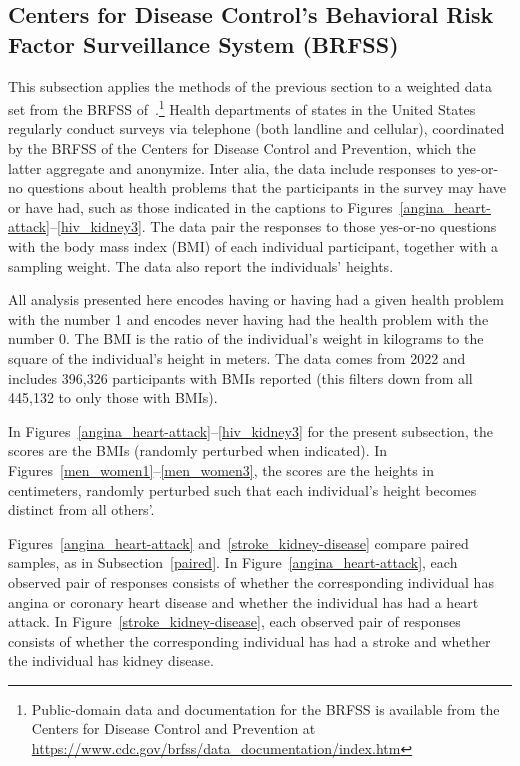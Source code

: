 \documentclass[]{fairmeta}
\begin{document}
\subsection{Centers for Disease Control's
Behavioral Risk Factor Surveillance System (BRFSS)}
\label{cdcbrfss}

This subsection applies the methods of the previous section
to a weighted data set from the BRFSS
of~\cite{brfss}.\footnote{Public-domain data and documentation for the BRFSS
is available from the Centers for Disease Control and Prevention at
\url{https://www.cdc.gov/brfss/data_documentation/index.htm}}
Health departments of states in the United States regularly conduct surveys
via telephone (both landline and cellular), coordinated by the BRFSS
of the Centers for Disease Control and Prevention,
which the latter aggregate and anonymize.
Inter alia, the data include responses to yes-or-no questions
about health problems that the participants in the survey may have or have had,
such as those indicated in the captions
to Figures~\ref{angina_heart-attack}--\ref{hiv_kidney3}.
The data pair the responses to those yes-or-no questions
with the body mass index (BMI) of each individual participant,
together with a sampling weight. The data also report the individuals' heights.

All analysis presented here encodes having or having had a given health problem
with the number 1 and encodes never having had the health problem
with the number 0. The BMI is the ratio of the individual's weight in kilograms
to the square of the individual's height in meters.
The data comes from 2022 and includes 396,326 participants with BMIs reported
(this filters down from all 445,132 to only those with BMIs).

In Figures~\ref{angina_heart-attack}--\ref{hiv_kidney3}
for the present subsection, the scores are the BMIs
(randomly perturbed when indicated).
In Figures~\ref{men_women1}--\ref{men_women3}, the scores are the heights
in centimeters, randomly perturbed such that each individual's height
becomes distinct from all others'.

Figures~\ref{angina_heart-attack} and~\ref{stroke_kidney-disease}
compare paired samples, as in Subsection~\ref{paired}.
In Figure~\ref{angina_heart-attack}, each observed pair of responses
consists of whether the corresponding individual has angina
or coronary heart disease and whether the individual has had a heart attack.
In Figure~\ref{stroke_kidney-disease}, each observed pair of responses
consists of whether the corresponding individual has had a stroke
and whether the individual has kidney disease.
\end{document}
